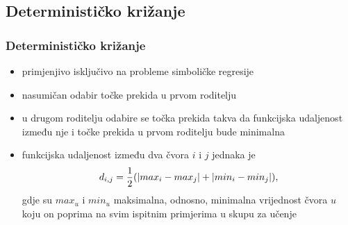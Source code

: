 \documentclass{beamer}
\begin{document}
\subsection{Determinističko križanje}
\begin{frame}
\frametitle{Determinističko križanje}
\begin{itemize}
\item{primjenjivo isključivo na probleme simboličke regresije}

\item{nasumičan odabir točke prekida u prvom roditelju}
\item{u drugom roditelju odabire se točka prekida takva da funkcijska udaljenost između nje i točke prekida u prvom roditelju bude minimalna}
\item{funkcijska udaljenost između dva čvora $i$ i $j$ jednaka je
\begin{equation} 
 \large{ d_{i,j} = \frac{1}{2} (|max_i - max_j| + |min_i - min_j|), }
\end{equation}
gdje su $max_u$ i $min_u$ maksimalna, odnosno, minimalna vrijednost čvora $u$ koju on poprima na svim ispitnim primjerima u skupu za učenje}
\end{itemize}
\end{frame}
\end{document}
